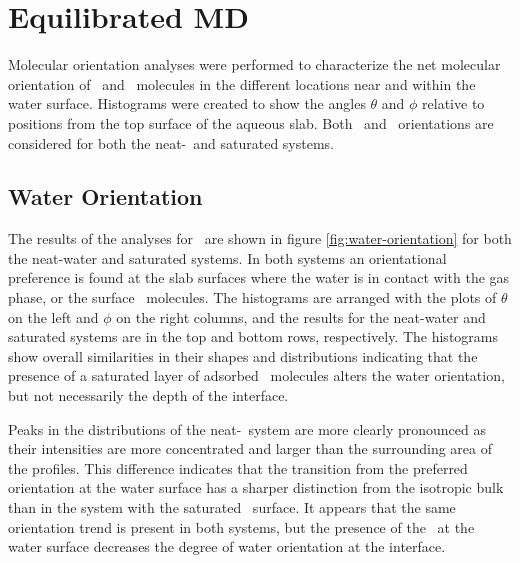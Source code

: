 \section{Equilibrated MD}

Molecular orientation analyses were performed to characterize the net molecular orientation of \wat~and \suldiox~molecules in the different locations near and within the water surface. Histograms were created to show the angles $\theta$ and $\phi$ relative to positions from the top surface of the aqueous slab. Both \wat~and \suldiox~orientations are considered for both the neat-\wat~and saturated systems.

\subsection{Water Orientation}

The results of the analyses for \wat~are shown in figure \ref{fig:water-orientation} for both the neat-water and saturated systems. In both systems an orientational preference is found at the slab surfaces where the water is in contact with the gas phase, or the surface \suldiox~molecules. The histograms are arranged with the plots of $\theta$ on the left and $\phi$ on the right columns, and the results for the neat-water and saturated systems are in the top and bottom rows, respectively. %
The histograms show overall similarities in their shapes and distributions indicating that the presence of a saturated layer of adsorbed \suldiox~molecules alters the water orientation, but not necessarily the depth of the interface.

Peaks in the distributions of the neat-\wat~system are more clearly pronounced as their intensities are more concentrated and larger than the surrounding area of the profiles. This difference indicates that the transition from the preferred orientation at the water surface has a sharper distinction from the isotropic bulk than in the system with the saturated \suldiox~surface. It appears that the same orientation trend is present in both systems, but the presence of the \suldiox~at the water surface decreases the degree of water orientation at the interface.

